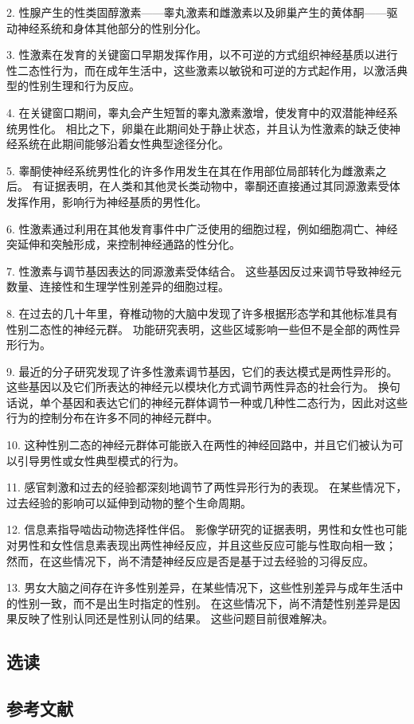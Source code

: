 2. 性腺产生的性类固醇激素——睾丸激素和雌激素以及卵巢产生的黄体酮——驱动神经系统和身体其他部分的性别分化。 

3. 性激素在发育的关键窗口早期发挥作用，以不可逆的方式组织神经基质以进行性二态性行为，而在成年生活中，这些激素以敏锐和可逆的方式起作用，以激活典型的性别生理和行为反应。 

4. 在关键窗口期间，睾丸会产生短暂的睾丸激素激增，使发育中的双潜能神经系统男性化。 相比之下，卵巢在此期间处于静止状态，并且认为性激素的缺乏使神经系统在此期间能够沿着女性典型途径分化。 

5. 睾酮使神经系统男性化的许多作用发生在其在作用部位局部转化为雌激素之后。 有证据表明，在人类和其他灵长类动物中，睾酮还直接通过其同源激素受体发挥作用，影响行为神经基质的男性化。 

6. 性激素通过利用在其他发育事件中广泛使用的细胞过程，例如细胞凋亡、神经突延伸和突触形成，来控制神经通路的性分化。 

7. 性激素与调节基因表达的同源激素受体结合。 这些基因反过来调节导致神经元数量、连接性和生理学性别差异的细胞过程。 

8. 在过去的几十年里，脊椎动物的大脑中发现了许多根据形态学和其他标准具有性别二态性的神经元群。 功能研究表明，这些区域影响一些但不是全部的两性异形行为。 

9. 最近的分子研究发现了许多性激素调节基因，它们的表达模式是两性异形的。 这些基因以及它们所表达的神经元以模块化方式调节两性异态的社会行为。 换句话说，单个基因和表达它们的神经元群体调节一种或几种性二态行为，因此对这些行为的控制分布在许多不同的神经元群中。 

10. 这种性别二态的神经元群体可能嵌入在两性的神经回路中，并且它们被认为可以引导男性或女性典型模式的行为。

11. 感官刺激和过去的经验都深刻地调节了两性异形行为的表现。 在某些情况下，过去经验的影响可以延伸到动物的整个生命周期。 

12. 信息素指导啮齿动物选择性伴侣。 影像学研究的证据表明，男性和女性也可能对男性和女性信息素表现出两性神经反应，并且这些反应可能与性取向相一致； 然而，在这些情况下，尚不清楚神经反应是否是基于过去经验的习得反应。 

13. 男女大脑之间存在许多性别差异，在某些情况下，这些性别差异与成年生活中的性别一致，而不是出生时指定的性别。 在这些情况下，尚不清楚性别差异是因果反映了性别认同还是性别认同的结果。 这些问题目前很难解决。

\subsection{选读}
\subsection{参考文献}
